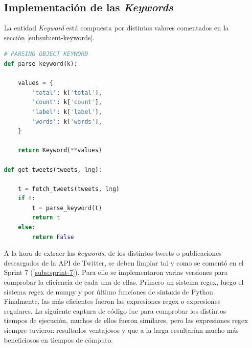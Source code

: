 \subsection{Implementación de las \textit{Keywords}}
La entidad \textit{Keyword} está compuesta por distintos valores comentados en la sección \ref{subsub:ent-keywords}.

\vspace{0.3cm}

\begin{lstlisting}[caption=Estructuración de las keywords,          label={lst:listing-python},language=Python]
# PARSING OBJECT KEYWORD
def parse_keyword(k):

    values = {
        'total': k['total'],
        'count': k['count'],
        'label': k['label'],
        'words': k['words'],
    }

    return Keyword(**values)

def get_tweets(tweets, lng):

    t = fetch_tweets(tweets, lng)
    if t:
        t = parse_keyword(t)
        return t
    else:
        return False
\end{lstlisting}

A la hora de extraer las \textit{keywords}, de los distintos tweets o publicaciones descargados de la API de Twitter, se deben limpiar tal y como se comentó en el Sprint 7 (\ref{subs:sprint-7}). Para ello se implementaron varias versiones para comprobar la eficiencia de cada una de ellas. Primero un sistema regex, luego el sistema regex de numpy y por último funciones de sintaxis de Python. Finalmente, las más eficientes fueron las expresiones regex o expresiones regulares. La siguiente captura de código fue para comprobar los distintos tiempos de ejecución, muchos de ellos fueron similares, pero las expresiones regex siempre tuvieron resultados ventajosos y que a la larga resultarían mucho más beneficiosos en tiempos de cómputo.

\vspace{0.3cm}

